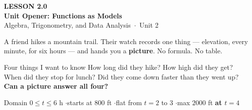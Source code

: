 \documentclass[aspectratio=169, 11pt]{beamer}
\begin{document}
{
\begin{frame}[plain]
  \vspace{2.8cm}\hspace{0.55cm}%
  \begin{minipage}{0.9\textwidth}
    {\color{goldacc}\bfseries\small LESSON 2.0}\\[0.5cm]
    {\color{white}\bfseries\LARGE Unit Opener: Functions as Models}\\[1.2cm]
    {\color{mistmid}\small Algebra, Trigonometry, and Data Analysis~$\cdot$~Unit 2}
  \end{minipage}
\end{frame}
}

\begin{frame}[t, plain]
  A friend hikes a mountain trail. Their watch records one thing --- elevation, every minute, for
  six hours --- and hands you a \textbf{picture}. No formula. No table.
  \begin{block}{Four things I want to know}
    How long did they hike? \quad How high did they get?\\
    When did they stop for lunch? \quad Did they come down faster than they went up?\\[2pt]
    \textbf{Can a picture answer all four?}
  \end{block}
\end{frame}

\begin{frame}[t, plain]
  \begin{center}
  \end{center}
  \vspace{-0.2cm}
  Domain $0 \le t \le 6$ h \quad$\cdot$\quad starts at $800$ ft \quad$\cdot$\quad flat from
  $t=2$ to $3$ \quad$\cdot$\quad max $2000$ ft \textbf{at $t=4$}
\end{frame}
\end{document}
